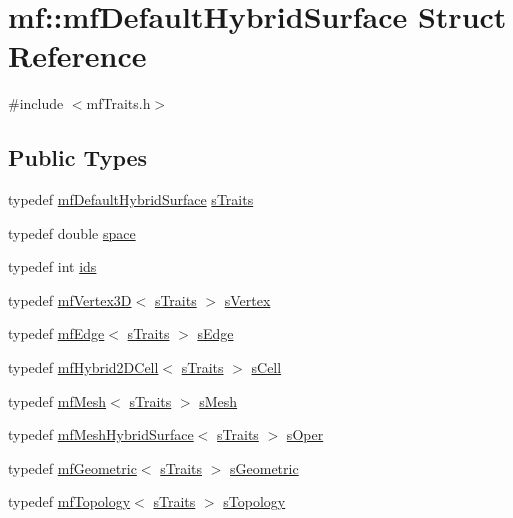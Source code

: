 \hypertarget{structmf_1_1mfDefaultHybridSurface}{
\section{mf::mfDefaultHybridSurface Struct Reference}
\label{structmf_1_1mfDefaultHybridSurface}
}


{\ttfamily \#include $<$mfTraits.h$>$}

\subsection*{Public Types}
\begin{DoxyCompactItemize}
\item 
typedef \hyperlink{structmf_1_1mfDefaultHybridSurface}{mfDefaultHybridSurface} \hyperlink{structmf_1_1mfDefaultHybridSurface_a6b7ae8a86c4047ca8a529515dc042449}{sTraits}
\item 
typedef double \hyperlink{structmf_1_1mfDefaultHybridSurface_aa60f8021d9313ec87752ef7c4909d2fa}{space}
\item 
typedef int \hyperlink{structmf_1_1mfDefaultHybridSurface_a06ff6d28f156383ae914862d15231cf6}{ids}
\item 
typedef \hyperlink{classmf_1_1mfVertex3D}{mfVertex3D}$<$ \hyperlink{structmf_1_1mfDefaultHybridSurface}{sTraits} $>$ \hyperlink{structmf_1_1mfDefaultHybridSurface_ad0362cd301479efd028b8e30d875332f}{sVertex}
\item 
typedef \hyperlink{classmf_1_1mfEdge}{mfEdge}$<$ \hyperlink{structmf_1_1mfDefaultHybridSurface}{sTraits} $>$ \hyperlink{structmf_1_1mfDefaultHybridSurface_a5c8e36a36a12cce1d11af275786101d8}{sEdge}
\item 
typedef \hyperlink{classmf_1_1mfHybrid2DCell}{mfHybrid2DCell}$<$ \hyperlink{structmf_1_1mfDefaultHybridSurface}{sTraits} $>$ \hyperlink{structmf_1_1mfDefaultHybridSurface_aba9244a2c4a635841589c4ff27b1eaaa}{sCell}
\item 
typedef \hyperlink{classmf_1_1mfMesh}{mfMesh}$<$ \hyperlink{structmf_1_1mfDefaultHybridSurface}{sTraits} $>$ \hyperlink{structmf_1_1mfDefaultHybridSurface_a3ef0c32e3cccb46dbc126f3d40ade56c}{sMesh}
\item 
typedef \hyperlink{classmf_1_1mfMeshHybridSurface}{mfMeshHybridSurface}$<$ \hyperlink{structmf_1_1mfDefaultHybridSurface}{sTraits} $>$ \hyperlink{structmf_1_1mfDefaultHybridSurface_a048af8fc38cf0f61cb53c72431bdf589}{sOper}
\item 
typedef \hyperlink{classmf_1_1mfGeometric}{mfGeometric}$<$ \hyperlink{structmf_1_1mfDefaultHybridSurface}{sTraits} $>$ \hyperlink{structmf_1_1mfDefaultHybridSurface_ae5b965dae8d0d44fffca8f6c2819487c}{sGeometric}
\item 
typedef \hyperlink{classmf_1_1mfTopology}{mfTopology}$<$ \hyperlink{structmf_1_1mfDefaultHybridSurface}{sTraits} $>$ \hyperlink{structmf_1_1mfDefaultHybridSurface_a695260a46e88e543eb52c963c21014a6}{sTopology}
\end{DoxyCompactItemize}


